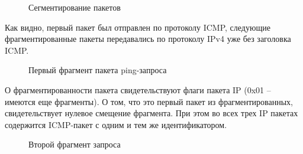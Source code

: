 \documentclass[a4paper, 14pt,russian]{article}
\begin{document}
		\begin{figure}[h!]
			\caption{Сегментирование пакетов}
			\label{img:frag_ping}
		\end{figure}
		
		Как видно, первый пакет был отправлен по протоколу ICMP, следующие фрагментированные пакеты передавались по протоколу IPv4 уже без заголовка ICMP.		
		
		\begin{figure}[h!]
			\caption{Первый фрагмент пакета ping-запроса}
			\label{img:frag_ping}
		\end{figure}
	
		О фрагментированности пакета свидетельствуют флаги пакета IP (0x01 – имеются еще фрагменты). О том, что это первый пакет из фрагментированных, свидетельствует нулевое смещение фрагмента. При этом во всех трех IP пакетах содержится ICMP-пакет с одним и тем же идентификатором.
		
		\begin{figure}[h!]
			\caption{Второй фрагмент запроса}
			\label{img:frag_ping}
		\end{figure}
	
\end{document}
